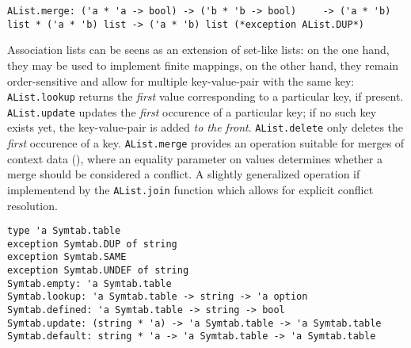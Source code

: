 \begin{isabellebody}
\begin{isamarkuptext}
\begin{mldecls}
  \verb|AList.merge: ('a * 'a -> bool) -> ('b * 'b -> bool)|\isasep\isanewline%
\verb|    -> ('a * 'b) list * ('a * 'b) list -> ('a * 'b) list (*exception AList.DUP*)|
  \end{mldecls}%
\end{isamarkuptext}%
\isamarkuptrue%
%
\begin{isamarkuptext}%
Association lists can be seens as an extension of set-like lists:
  on the one hand, they may be used to implement finite mappings,
  on the other hand, they remain order-sensitive and allow for
  multiple key-value-pair with the same key: \verb|AList.lookup|
  returns the \emph{first} value corresponding to a particular
  key, if present.  \verb|AList.update| updates
  the \emph{first} occurence of a particular key; if no such
  key exists yet, the key-value-pair is added \emph{to the front}.
  \verb|AList.delete| only deletes the \emph{first} occurence of a key.
  \verb|AList.merge| provides an operation suitable for merges of context data
  (), where an equality parameter on
  values determines whether a merge should be considered a conflict.
  A slightly generalized operation if implementend by the \verb|AList.join|
  function which allows for explicit conflict resolution.%
\end{isamarkuptext}%
\isamarkuptrue%
%
\isamarkuptrue%
%
\begin{isamarkuptext}%
\begin{mldecls}
  \verb|type 'a Symtab.table| \\
  \verb|exception Symtab.DUP of string| \\
  \verb|exception Symtab.SAME| \\
  \verb|exception Symtab.UNDEF of string| \\
  \verb|Symtab.empty: 'a Symtab.table| \\
  \verb|Symtab.lookup: 'a Symtab.table -> string -> 'a option| \\
  \verb|Symtab.defined: 'a Symtab.table -> string -> bool| \\
  \verb|Symtab.update: (string * 'a) -> 'a Symtab.table -> 'a Symtab.table| \\
  \verb|Symtab.default: string * 'a -> 'a Symtab.table -> 'a Symtab.table| \\

\end{mldecls}
\end{isamarkuptext}
\end{isabellebody}
